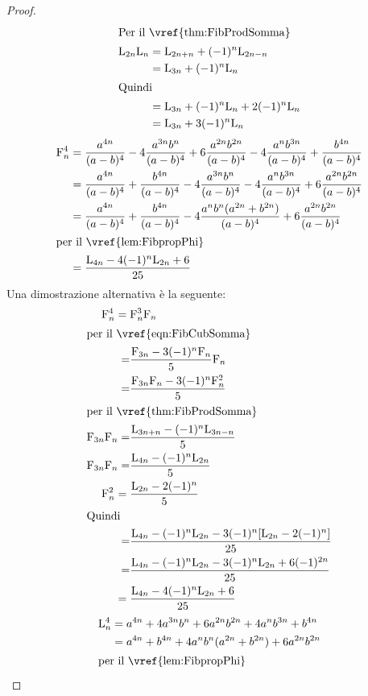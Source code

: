 \begin{proof}
\begin{align*}
	\intertext{Per il~\vref{thm:FibProdSomma}}
	\Luc{2n}\Luc{n}={}&\Luc{2n+n}+(-1)^n\Luc{2n-n}\\
	={}&\Luc{3n}+(-1)^n\Luc{n}\\	
	\intertext{Quindi}	
	={}&\Luc{3n}+(-1)^n\Luc{n}+2(-1)^n\Luc{n}\\
={}&\Luc{3n}+3(-1)^n\Luc{n}\\
\end{align*}
\begin{align*}
	\Fib{n}^4={}&\dfrac{a^{4n}}{(a-b)^4}-4\dfrac{a^{3n}b^{n}}{(a-b)^4}+6\dfrac{a^{2n}b^{2n}}{(a-b)^4}-4\dfrac{a^{n}b^{3n}}{(a-b)^4}+\dfrac{b^{4n}}{(a-b)^4}\\
	={}&\dfrac{a^{4n}}{(a-b)^4}+\dfrac{b^{4n}}{(a-b)^4}-4\dfrac{a^{3n}b^{n}}{(a-b)^4}-4\dfrac{a^{n}b^{3n}}{(a-b)^4}+6\dfrac{a^{2n}b^{2n}}{(a-b)^4}\\
	={}&\dfrac{a^{4n}}{(a-b)^4}+\dfrac{b^{4n}}{(a-b)^4}-4\dfrac{a^{n}b^{n}(a^{2n}+b^{2n})}{(a-b)^4}+6\dfrac{a^{2n}b^{2n}}{(a-b)^4}\\
	\intertext{per il~\vref{lem:FibpropPhi}} 
	={}&\dfrac{\Luc{4n}-4(-1)^n\Luc{2n}+6}{25}
\end{align*}
Una dimostrazione alternativa è la seguente:
\begin{align*}
\Fib{n}^4={}&\Fib{n}^3\Fib{n}\\
\intertext{per il~\vref{eqn:FibCubSomma}}
=&\dfrac{\Fib{3n}-3(-1)^n\Fib{n}}{5}\Fib{n}\\
=&\dfrac{\Fib{3n}\Fib{n}-3(-1)^n\Fib{n}^2}{5}\\
\intertext{per il~\vref{thm:FibProdSomma}}
\Fib{3n}\Fib{n}=&\dfrac{\Luc{3n+n}-(-1)^n\Luc{3n-n}}{5}\\
\Fib{3n}\Fib{n}=&\dfrac{\Luc{4n}-(-1)^n\Luc{2n}}{5}\\
\Fib{n}^2={}&\dfrac{\Luc{2n}-2(-1)^n}{5}\\
\intertext{Quindi}
=&\dfrac{\Luc{4n}-(-1)^n\Luc{2n}-3(-1)^n[\Luc{2n}-2(-1)^n]}{25}\\
=&\dfrac{\Luc{4n}-(-1)^n\Luc{2n}-3(-1)^n\Luc{2n}+6(-1)^{2n}}{25}\\
={}&\dfrac{\Luc{4n}-4(-1)^n\Luc{2n}+6}{25}\\
\end{align*}
\begin{align*}
	\Luc{n}^4={}&a^{4n}+4a^{3n}b^{n}+6a^{2n}b^{2n}+4a^{n}b^{3n}+b^{4n}\\
	={}&a^{4n}+b^{4n}+4a^{n}b^{n}(a^{2n}+b^{2n})+6a^{2n}b^{2n}\\
	\intertext{per il~\vref{lem:FibpropPhi}} 

\end{align*}
\end{proof}
